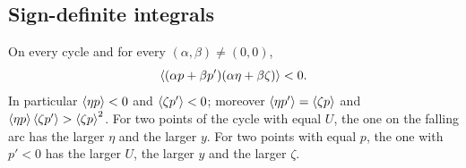 \subsection{Sign-definite integrals}
\begin{proposition}\label{prop:monotoneintegrals}
On every cycle and for every $(\alpha,\beta)\ne(0,0)$,
\begin{equation}\label{gau:monotone}
\left\langle (\alpha p+\beta p')(\alpha\eta+\beta\zeta)\right\rangle<0 .
\end{equation}
In particular $\left\langle \eta p\right\rangle<0$ and $\left\langle \zeta p'\right\rangle<0$; moreover $\left\langle \eta p'\right\rangle=\left\langle \zeta p\right\rangle$ and $\left\langle \eta p\right\rangle\left\langle \zeta p'\right\rangle>\left\langle \zeta p\right\rangle^2$. For two points of the cycle with equal $U$, the one on the falling arc has the larger $\eta$ and the larger $y$. For two points with equal $p$, the one with $p'<0$ has the larger $U$, the larger $y$ and the larger $\zeta$.
\end{proposition}
